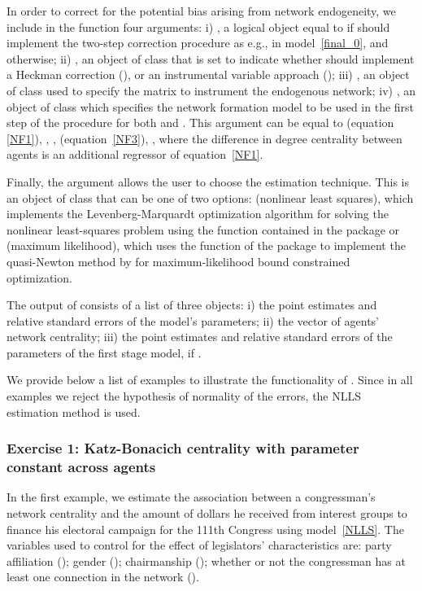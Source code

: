 \documentclass[nojss]{jss}
\begin{document}
In order to correct for the potential bias arising from network endogeneity, we include in the function four arguments: i) , a logical object equal to  if  should implement the two-step correction procedure as e.g., in model~\ref{final_0}, and 
otherwise; ii) , an object of class  that is set to indicate whether  should implement a Heckman correction (), or an instrumental variable approach (); iii) ,
an object of class  used to specify the matrix to instrument the endogenous network; iv) , an object of class  which specifies the network formation model to be used in the first step of the procedure for both  and . This argument can be equal to  (equation~
\ref{NF1}),  \cite[equation~\ref{NF2}, as in][]{Fafchamps+Leij+Goyal:2010},
\cite[equation~\ref{NF2}, as in][]{Graham:2015},  (equation~\ref{NF3}), , where the difference in degree centrality between agents is an additional regressor of equation~\ref{NF1}.

Finally, the argument  allows the user to choose the estimation technique. This is an object of class  that can be one of two options:  (nonlinear least squares), which implements the Levenberg-Marquardt optimization algorithm for solving the nonlinear least-squares problem using the function  contained in the  package  \citep{minpack.lm} or  (maximum likelihood), which uses the function  of the  package  to implement the quasi-Newton method by \cite{bbmle} for maximum-likelihood bound constrained optimization.

The output of  consists of a list of three objects: i) the point estimates and relative standard errors of the model's parameters; ii) the vector of agents' network centrality; iii) the point estimates and relative standard errors of the parameters of the first stage model, if .

We provide below a list of examples to illustrate the functionality of . Since in all examples we reject the hypothesis of normality of the errors, the NLLS estimation method is used.

\subsubsection{Exercise 1: Katz-Bonacich centrality with parameter constant across agents}
In the first example, we estimate the association between a congressman's network centrality and the amount of dollars he received from interest groups to finance his electoral campaign for the 111th Congress using model~\ref{NLLS}. The variables used to control for the effect of legislators' characteristics are: party affiliation (); gender (); chairmanship (); whether or not the congressman has at least one connection in the network ().
\end{document}

